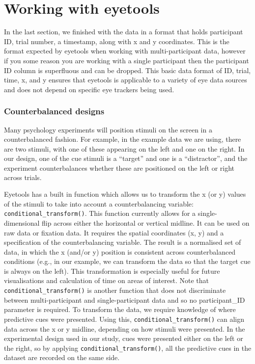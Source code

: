 \documentclass[
  man,
  floatsintext,
  longtable,
  nolmodern,
  notxfonts,
  notimes,
  colorlinks=true,linkcolor=blue,citecolor=blue,urlcolor=blue]{apa7}
\begin{document}
\section{Working with eyetools}\label{working-with-eyetools}

In the last section, we finished with the data in a format that holds
participant ID, trial number, a timestamp, along with x and y
coordinates. This is the format expected by eyetools when working with
multi-participant data, however if you some reason you are working with
a single participant then the participant ID column is superfluous and
can be dropped. This basic data format of ID, trial, time, x, and y
ensures that eyetools is applicable to a variety of eye data sources and
does not depend on specific eye trackers being used.

\subsubsection{Counterbalanced designs}\label{counterbalanced-designs}

Many psychology experiments will position stimuli on the screen in a
counterbalanced fashion. For example, in the example data we are using,
there are two stimuli, with one of these appearing on the left and one
on the right. In our design, one of the cue stimuli is a ``target'' and
one is a ``distractor'', and the experiment counterbalances whether
these are positioned on the left or right across trials.

Eyetools has a built in function which allows us to transform the x (or
y) values of the stimuli to take into account a counterbalancing
variable: \texttt{conditional\_transform()}. This function currently
allows for a single-dimensional flip across either the horizontal or
vertical midline. It can be used on raw data or fixation data. It
requires the spatial coordinates (x, y) and a specification of the
counterbalancing variable. The result is a normalised set of data, in
which the x (and/or y) position is consistent across counterbalanced
conditions (e.g., in our example, we can transform the data so that the
target cue is always on the left). This transformation is especially
useful for future visualisations and calculation of time on areas of
interest. Note that \texttt{conditional\_transform()} is another
function that does not discriminate between multi-participant and
single-participant data and so no participant\_ID parameter is required.
To transform the data, we require knowledge of where predictive cues
were presented. Using this, \texttt{conditional\_transform()} can align
data across the x or y midline, depending on how stimuli were presented.
In the experimental design used in our study, cues were presented either
on the left or the right, so by applying
\texttt{conditional\_transform()}, all the predictive cues in the
dataset are recorded on the same side.
\end{document}
